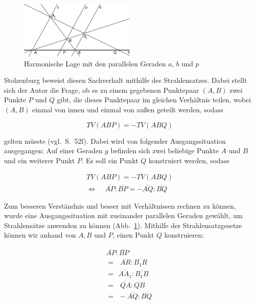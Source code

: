 \documentclass[12pt,a4paper]{article}
\begin{document}
\begin{figure}[htbp]
\centering
\includegraphics[width=0.5\textwidth]{Bilder/doppelverhaeltnis.png}
\caption{Harmonische Lage mit den parallelen Geraden $a$, $b$ und $p$}
\label{fig:harmonDoppel}
\end{figure}

Stolzenburg beweist diesen Sachverhalt mithilfe des Strahlensatzes. Dabei stellt sich der Autor die Frage, ob es zu einem gegebenen Punktepaar $(A, B)$ zwei Punkte $P$ und $Q$ gibt, die dieses Punktepaar im gleichen Verhältnis teilen, wobei $(A,  B)$ einmal von innen und einmal von außen geteilt werden, sodass

\[TV(A B P) = -TV(A B Q)\]

gelten müsste (vgl.~S.~52f). Dabei wird von folgender Ausgangssituation ausgegangen: Auf einer Geraden $g$ befinden sich zwei beliebige Punkte $A$ und $B$ und ein weiterer Punkt $P$. Es soll ein Punkt $Q$ konstruiert werden, sodass 

\begin{equation*}
\begin{split}
TV(A B P) = -TV(A B Q) \\
\Longleftrightarrow ~~~~~\overline{A P} : \overline{B P} = -\overline{A Q} : \overline{B Q}~~
\end{split}
\end{equation*}

Zum besseren Verständnis und besser mit Verhältnissen rechnen zu können, wurde eine Ausgangssituation mit zueinander parallelen Geraden gewählt, um Strahlensätze anwenden zu können (Abb.~\ref{fig:harmonDoppel}). Mithilfe der Strahlensatzgesetze können wir anhand von $A, B$ und $P$, einen Punkt $Q$ konstruieren:

\begin{equation*}
\begin{split}
  \overline{A P} : \overline{B P}~ \\
=~~~\overline{A R} : \overline{B_1 R}  \\
=~~\overline{A A_1} : \overline{B_1 B}  \\
=~~~\overline{Q A} : \overline{Q B}~ \\
=~~-\overline{A Q} : \overline{B Q}~
\end{split}
\end{equation*}
\end{document}

